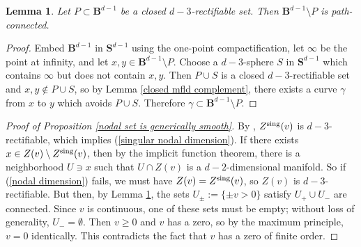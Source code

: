 \documentclass[reqno,11pt]{amsart}
\newcommand{\Sph}{\mathbf S}
\newcommand{\Ball}{\mathbf{B}}
\newtheorem{lemma}[theorem]{Lemma}
\theoremstyle{definition}
\numberwithin{equation}{section}
\begin{document}
\begin{lemma}\label{open mfld complement}
Let $P \subset \Ball^{d - 1}$ be a closed $d - 3$-rectifiable set.
Then $\Ball^{d - 1} \setminus P$ is path-connected.
\end{lemma}
\begin{proof}
Embed $\Ball^{d - 1}$ in $\Sph^{d - 1}$ using the one-point compactification, let $\infty$ be the point at infinity, and let $x, y \in \Ball^{d - 1} \setminus P$.
Choose a $d - 3$-sphere $S$ in $\Sph^{d - 1}$ which contains $\infty$ but does not contain $x, y$.
Then $P \cup S$ is a closed $d - 3$-rectifiable set and $x, y \notin P \cup S$, so by Lemma \ref{closed mfld complement}, there exists a curve $\gamma$ from $x$ to $y$ which avoids $P \cup S$.
Therefore $\gamma \subset \Ball^{d - 1} \setminus P$.
\end{proof}

\begin{proof}[Proof of Proposition \ref{nodal set is generically smooth}]
By \cite[Lemma 1.9]{Hardt89}, $Z^{\rm sing}(v)$ is $d - 3$-rectifiable, which implies (\ref{singular nodal dimension}).
If there exists $x \in Z(v) \setminus Z^{\rm sing}(v)$, then by the implicit function theorem, there is a neighborhood $U \ni x$ such that $U \cap Z(v)$ is a $d - 2$-dimensional manifold.
So if (\ref{nodal dimension}) fails, we must have $Z(v) = Z^{\rm sing}(v)$, so $Z(v)$ is $d - 3$-rectifiable.
But then, by Lemma \ref{open mfld complement}, the sets $U_\pm := \{\pm v > 0\}$ satisfy $U_+ \cup U_-$ are connected.
Since $v$ is continuous, one of these sets must be empty; without loss of generality, $U_- = \emptyset$.
Then $v \geq 0$ and $v$ has a zero, so by the maximum principle, $v = 0$ identically.
This contradicts the fact that $v$ has a zero of finite order.
\end{proof}
\end{document}
